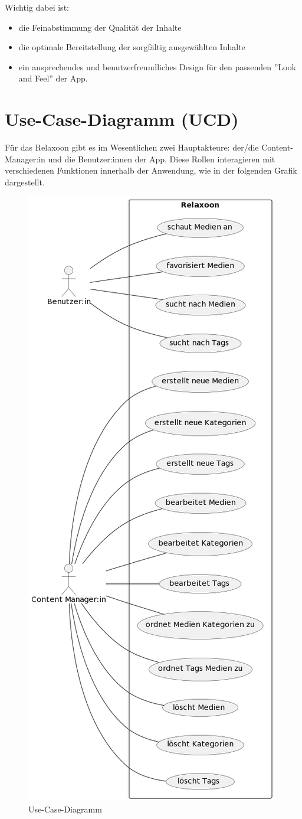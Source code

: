 Wichtig dabei ist: 

\begin{itemize}
    \item die Feinabstimmung der Qualität der Inhalte
    \item die optimale Bereitstellung der sorgfältig ausgewählten Inhalte
    \item ein ansprechendes und benutzerfreundliches Design für den passenden ''Look and Feel'' der App.
\end{itemize}

\section{Use-Case-Diagramm (UCD)}

Für das Relaxoon gibt es im Wesentlichen zwei Hauptakteure: der/die Content-Manager:in und die Benutzer:innen der 
App. Diese Rollen interagieren mit verschiedenen Funktionen innerhalb der Anwendung, wie in der folgenden Grafik 
dargestellt.

\begin{figure}[H]
    \centering
    \includegraphics[height=1.3\textwidth]{./pics/ucd.png}
    \caption{Use-Case-Diagramm}
\end{figure}

